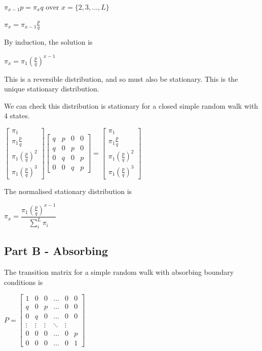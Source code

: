 \documentclass{article}
\begin{document}
$\pi_{x-1} p = \pi_x q \text{ over } x = \{2,3,..., L\}$


$ \pi_x = \pi_{x-1} \frac{p}{q} $

By induction, the solution is

$\pi_x = \pi_1 (\frac{p}{q})^{x-1}$

This is a reversible distribution, and so must also be stationary. This is the unique stationary distribution.

We can check this distribution is stationary for a closed simple random walk with 4 states.

\bigskip

 $\begin{bmatrix}
    \pi_1 \\
    \pi_1\frac{p}{q} \\
    \pi_1(\frac{p}{q})^2 \\
    \pi_1(\frac{p}{q})^3 
\end{bmatrix}
\begin{bmatrix}
    q & p & 0 & 0 \\
    q & 0 & p & 0\\
    0 & q & 0 & p\\
    0 & 0 & q & p
\end{bmatrix} = 
\begin{bmatrix}
    \pi_1 \\
    \pi_1\frac{p}{q} \\
    \pi_1(\frac{p}{q})^2 \\
    \pi_1(\frac{p}{q})^3 
\end{bmatrix}$

\bigskip

The normalised stationary distribution is

$\pi_x = \dfrac{\pi_1(\frac{p}{q})^{x-1}}{\sum_i^L{\pi_i}}$

\subsection{Part B - Absorbing}

The transition matrix for a simple random walk with absorbing boundary conditions is

\bigskip

$P = \begin{bmatrix}
    1 & 0 & 0 & \dots  & 0 & 0 \\
    q & 0 & p & \dots  & 0 & 0\\
    0 & q & 0 & \dots  & 0 & 0\\
    \vdots & \vdots & \vdots & \ddots & \vdots \\
    0 & 0 & 0 & \dots & 0 & p \\
    0 & 0 & 0 & \dots & 0 & 1
\end{bmatrix}$
\end{document}

